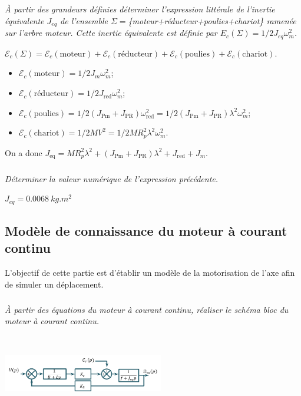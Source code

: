 \documentclass[10pt,fleqn]{article} %
\begin{document}
\begin{multicols}{2}
\subparagraph{}
\textit{À partir des grandeurs définies déterminer l'expression littérale de l'inertie équivalente $J_{eq}$ de l'ensemble $\Sigma=$\{moteur+réducteur+poulies+chariot\} ramenée sur l'arbre moteur. Cette inertie équivalente est définie par $E_c (\Sigma)=1/2 J_{eq} \omega_m^2$.}
\ifprof
\begin{corrige}
$\mathcal{E}_c(\Sigma)=\mathcal{E}_c (\text{moteur})+\mathcal{E}_c (\text{réducteur})+\mathcal{E}_c (\text{poulies})+\mathcal{E}_c (\text{chariot})$.
\begin{itemize}
	\item $\mathcal{E}_c (\text{moteur})=1/2 J_m \omega_m^2$;
	\item $\mathcal{E}_c (\text{réducteur})=1/2 J_{\text{red}} \omega_m^2$;
	\item $\mathcal{E}_c (\text{poulies})=1/2 (J_{\text{Pm}}+J_{\text{PR}}  ) \omega_{\text{red}}^2=1/2 (J_{\text{Pm}}+J_{\text{PR}}  ) \lambda^2 \omega_m^2$;
	\item $\mathcal{E}_c (\text{chariot})=1/2 MV^2=1/2 MR_p^2 \lambda^2 \omega_m^2$.
\end{itemize}
On a donc $J_{\text{eq}}=MR_p^2 \lambda^2+(J_{\text{Pm}}+J_{\text{PR}}  ) \lambda^2+J_{\text{red}}+J_m$.

\end{corrige}
\else
\fi

\subparagraph{}
\textit{Déterminer la valeur numérique de l'expression précédente.}
\ifprof
\begin{corrige}
$J_{eq}=\SI{0,0068}{kg.m^2}$
\end{corrige}
\else
\fi

\subsection*{Modèle de connaissance du moteur à courant continu}

\begin{obj}
L'objectif de cette partie est d'établir un modèle de la motorisation de l'axe afin de simuler un déplacement.
\end{obj}

\subparagraph{}
\textit{À partir des équations du moteur à courant continu, réaliser le schéma bloc du moteur à courant continu.}
\ifprof
\begin{corrige} ~\\

\begin{center}
\includegraphics[width=7cm]{images/corr_01}
\end{center} 
\end{corrige}
\else
\fi


\end{multicols}
\end{document}
